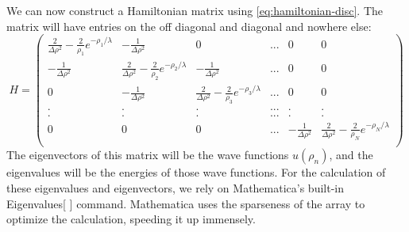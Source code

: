 \documentclass[12pt,twoside]{reedthesis}
\begin{document}
We can now construct a Hamiltonian matrix using \eqref{eq:hamiltonian-disc}. The matrix will have entries on the off diagonal and diagonal and nowhere else:
\begin{equation*}H = \left(
\begin{array}{cccccc}
\frac{2} {\Delta \rho^2} -  \frac{2}{\rho_1}e^{-\rho_1/\lambda} & -\frac{1}{\Delta \rho^2} &  0 & ... & 0 & 0 \\
-\frac{1}{\Delta \rho^2} & \frac{2} {\Delta \rho^2} -  \frac{2}{\rho_2}e^{-\rho_2/\lambda} &  -\frac{1}{\Delta \rho^2}  & ... & 0 & 0 \\
0 &  -\frac{1}{\Delta \rho^2} & \frac{2} {\Delta \rho^2} -  \frac{2}{\rho_3}e^{-\rho_3/\lambda} &  ...  & 0 & 0 \\
 .&  . &.  &... & .& .  \\
 .& . & . & ...& .&  . \\
0 & 0 &  0 & ...&  -\frac{1}{\Delta \rho^2} & \frac{2} {\Delta \rho^2} -  \frac{2}{\rho_N}e^{-\rho_N/\lambda}   \\
\end{array}
\right)
\end{equation*}
The eigenvectors of this matrix will be the wave functions $u(\rho_n)$, and the eigenvalues will be the energies of those wave functions. For the calculation of these eigenvalues and eigenvectors, we rely on Mathematica's built-in Eigenvalues[ ] command. Mathematica uses the sparseness of the array to optimize the calculation, speeding it up immensely. 
\end{document}
